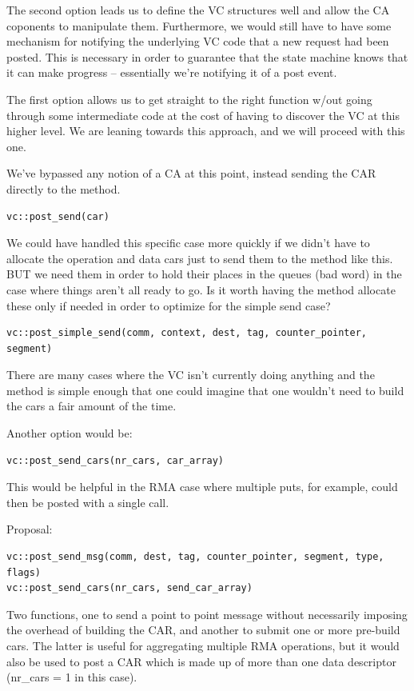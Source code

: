 \documentclass[11pt,letterpaper]{article}
\begin{document}
The second option leads us to define the VC structures well and allow the CA
coponents to manipulate them.  Furthermore, we would still have to have some
mechanism for notifying the underlying VC code that a new request had been
posted.  This is necessary in order to guarantee that the state machine knows
that it can make progress -- essentially we're notifying it of a post event.

The first option allows us to get straight to the right function w/out going
through some intermediate code at the cost of having to discover the VC at this
higher level.  We are leaning towards this approach, and we will proceed with
this one.

We've bypassed any notion of a CA at this point, instead sending the CAR
directly to the method.

\begin{verbatim}
vc::post_send(car)
\end{verbatim}

We could have handled this specific case more quickly if we didn't have to allocate the operation and data cars just to send them to the method like this.  BUT we need them in order to hold their places in the queues (bad word) in the case where things aren't all ready to go.  Is it worth having the method allocate these only if needed in order to optimize for the simple send case?

\begin{verbatim}
vc::post_simple_send(comm, context, dest, tag, counter_pointer, segment)
\end{verbatim}
There are many cases where the VC isn't currently doing anything and the method
is simple enough that one could imagine that one wouldn't need to build the
cars a fair amount of the time.

Another option would be:
\begin{verbatim}
vc::post_send_cars(nr_cars, car_array)
\end{verbatim}
This would be helpful in the RMA case where multiple puts, for example, could
then be posted with a single call.

Proposal:
\begin{verbatim}
vc::post_send_msg(comm, dest, tag, counter_pointer, segment, type, flags)
vc::post_send_cars(nr_cars, send_car_array)
\end{verbatim}
Two functions, one to send a point to point message without necessarily
imposing the overhead of building the CAR, and another to submit one or more
pre-build cars.  The latter is useful for aggregating multiple RMA operations,
but it would also be used to post a CAR which is made up of more than one data
descriptor (nr\_cars = 1 in this case).
\end{document}

